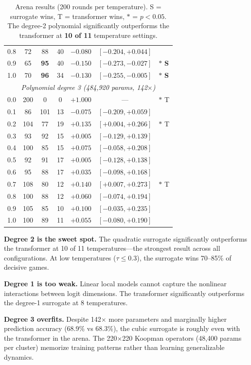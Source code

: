 \documentclass[11pt]{article}
\theoremstyle{definition}
\begin{document}
\begin{table}[H]
\begin{tabular}{lcccccl}
0.8 & 72 & 88 & 40 & $-0.080$ & $[-0.204, +0.044]$ & \\
0.9 & 65 & \textbf{95} & 40 & $-0.150$ & $[-0.273, -0.027]$ & $*$ \textbf{S} \\
1.0 & 70 & \textbf{96} & 34 & $-0.130$ & $[-0.255, -0.005]$ & $*$ \textbf{S} \\
\midrule
\multicolumn{7}{c}{\textit{Polynomial degree 3 (484,920 params, 142$\times$)}} \\
\midrule
0.0 & 200 & 0 & 0 & $+1.000$ & --- & $*$ T \\
0.1 & 86 & 101 & 13 & $-0.075$ & $[-0.209, +0.059]$ & \\
0.2 & 104 & 77 & 19 & $+0.135$ & $[+0.004, +0.266]$ & $*$ T \\
0.3 & 93 & 92 & 15 & $+0.005$ & $[-0.129, +0.139]$ & \\
0.4 & 100 & 85 & 15 & $+0.075$ & $[-0.058, +0.208]$ & \\
0.5 & 92 & 91 & 17 & $+0.005$ & $[-0.128, +0.138]$ & \\
0.6 & 95 & 88 & 17 & $+0.035$ & $[-0.098, +0.168]$ & \\
0.7 & 108 & 80 & 12 & $+0.140$ & $[+0.007, +0.273]$ & $*$ T \\
0.8 & 100 & 88 & 12 & $+0.060$ & $[-0.074, +0.194]$ & \\
0.9 & 105 & 85 & 10 & $+0.100$ & $[-0.035, +0.235]$ & \\
1.0 & 100 & 89 & 11 & $+0.055$ & $[-0.080, +0.190]$ & \\
\bottomrule
\end{tabular}
\caption{Arena results (200 rounds per temperature). S = surrogate wins, T = transformer wins, $*$ = $p < 0.05$. The degree-2 polynomial significantly outperforms the transformer at \textbf{10 of 11} temperature settings.}
\label{tab:arena}
\end{table}

\textbf{Degree 2 is the sweet spot.} The quadratic surrogate significantly outperforms the transformer at 10 of 11 temperatures---the strongest result across all configurations. At low temperatures ($\tau \leq 0.3$), the surrogate wins 70--85\% of decisive games.

\textbf{Degree 1 is too weak.} Linear local models cannot capture the nonlinear interactions between logit dimensions. The transformer significantly outperforms the degree-1 surrogate at 8 temperatures.

\textbf{Degree 3 overfits.} Despite 142$\times$ more parameters and marginally higher prediction accuracy (68.9\% vs 68.3\%), the cubic surrogate is roughly even with the transformer in the arena. The 220$\times$220 Koopman operators (48,400 params per cluster) memorize training patterns rather than learning generalizable dynamics.
\end{document}
